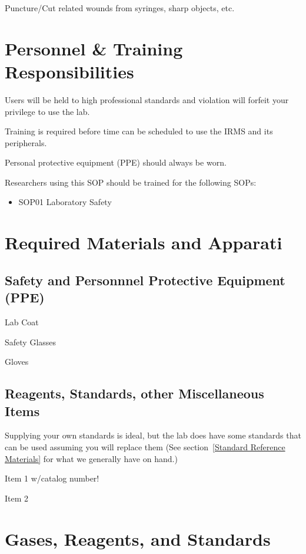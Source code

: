 \documentclass[12pt]{../SOP3_beta}\usepackage[]{graphicx}\usepackage[]{color}
\begin{document}
\NP Puncture/Cut related wounds from syringes, sharp objects, etc.

\section{Personnel \& Training Responsibilities}

\NP Users will be held to high professional standards and violation will forfeit your privilege to use the lab.

\NP Training is required before time can be scheduled to use the IRMS and its peripherals.

\NP Personal protective equipment (PPE) should always be worn. 

\NP Researchers using this SOP should be trained for the following SOPs:

\begin{itemize}
  \item SOP01 Laboratory Safety
\end{itemize}

\section{Required Materials and Apparati}

\subsection{Safety and Personnnel Protective Equipment (PPE)}

\NP Lab Coat

\NP Safety Glasses

\NP Gloves

\subsection{Reagents, Standards, other Miscellaneous Items}

\NP Supplying your own standards is ideal, but the lab does have some standards that can be used assuming you will replace them (See section~\ref{Standard Reference Materials} for what we generally have on hand.)


\NP Item 1 w/catalog number!

\NP Item 2

\section{Gases, Reagents, and Standards}
\end{document}

